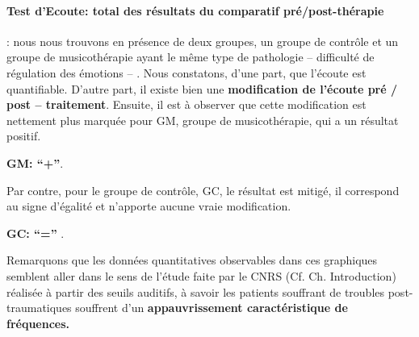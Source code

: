  

\paragraph{Test d'Ecoute: total des résultats du comparatif pré/post-thérapie}
 : nous nous trouvons
           en présence de deux groupes, un groupe de contrôle et un
           groupe de musicothérapie ayant le même type de
           pathologie -- difficulté de régulation des émotions -- .
Nous constatons, d'une part, que l'écoute est quantifiable.
           D'autre part, il existe bien
          une \textbf{modification de l'écoute pré / post -- traitement}.
Ensuite, il est à observer que
          cette modification est nettement plus marquée
          pour GM, groupe de musicothérapie, qui a un résultat positif.


          \textbf{GM: ``+''}.


Par contre,  pour le groupe de contrôle, GC, le résultat est mitigé, il correspond au signe d'égalité et n'apporte aucune vraie modification.

          \textbf{GC:  ``='' }.


        Remarquons que les données quantitatives observables dans ces graphiques semblent aller dans le
sens de  l'étude faite par le
CNRS (Cf. Ch. Introduction) \autocite{affectiveDisorders} réalisée à partir des seuils auditifs, à savoir
les patients souffrant de troubles post-traumatiques souffrent d'un
\textbf{appauvrissement caractéristique de fréquences.}

